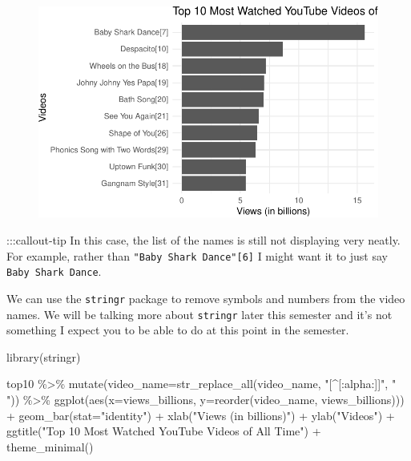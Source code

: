 \documentclass[
  letterpaper,
  DIV=11,
  numbers=noendperiod]{scrartcl}
\newenvironment{Shaded}{\begin{snugshade}}{\end{snugshade}}
\newcommand{\AttributeTok}[1]{\textcolor[rgb]{0.40,0.45,0.13}{#1}}
\newcommand{\FunctionTok}[1]{\textcolor[rgb]{0.28,0.35,0.67}{#1}}
\newcommand{\NormalTok}[1]{\textcolor[rgb]{0.00,0.23,0.31}{#1}}
\newcommand{\SpecialCharTok}[1]{\textcolor[rgb]{0.37,0.37,0.37}{#1}}
\newcommand{\StringTok}[1]{\textcolor[rgb]{0.13,0.47,0.30}{#1}}
\begin{document}
\begin{figure}[H]

{\centering \includegraphics{118_N_webscraping_tables_files/figure-pdf/unnamed-chunk-9-1.pdf}

}

\end{figure}

:::callout-tip In this case, the list of the names is still not
displaying very neatly. For example, rather than
\texttt{"Baby\ Shark\ Dance"{[}6{]}} I might want it to just say
\texttt{Baby\ Shark\ Dance}.

We can use the \texttt{stringr} package to remove symbols and numbers
from the video names. We will be talking more about \texttt{stringr}
later this semester and it's not something I expect you to be able to do
at this point in the semester.

\begin{Shaded}
\begin{Highlighting}[]
\FunctionTok{library}\NormalTok{(stringr)}

\NormalTok{top10 }\SpecialCharTok{\%\textgreater{}\%} 
  \FunctionTok{mutate}\NormalTok{(}\AttributeTok{video\_name=}\FunctionTok{str\_replace\_all}\NormalTok{(video\_name, }\StringTok{"[\^{}[:alpha:]]"}\NormalTok{, }\StringTok{" "}\NormalTok{)) }\SpecialCharTok{\%\textgreater{}\%} 
  \FunctionTok{ggplot}\NormalTok{(}\FunctionTok{aes}\NormalTok{(}\AttributeTok{x=}\NormalTok{views\_billions, }\AttributeTok{y=}\FunctionTok{reorder}\NormalTok{(video\_name, views\_billions))) }\SpecialCharTok{+}
    \FunctionTok{geom\_bar}\NormalTok{(}\AttributeTok{stat=}\StringTok{"identity"}\NormalTok{) }\SpecialCharTok{+}
    \FunctionTok{xlab}\NormalTok{(}\StringTok{"Views (in billions)"}\NormalTok{) }\SpecialCharTok{+}
    \FunctionTok{ylab}\NormalTok{(}\StringTok{"Videos"}\NormalTok{) }\SpecialCharTok{+}
    \FunctionTok{ggtitle}\NormalTok{(}\StringTok{"Top 10 Most Watched YouTube Videos of All Time"}\NormalTok{) }\SpecialCharTok{+}
    \FunctionTok{theme\_minimal}\NormalTok{()}
\end{Highlighting}
\end{Shaded}
\end{document}
